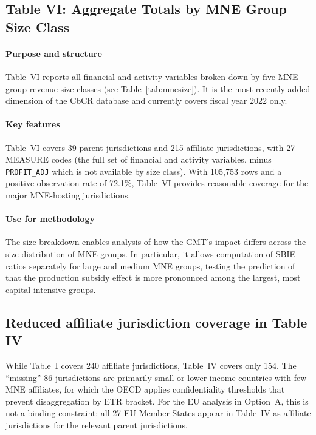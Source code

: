 \documentclass[11pt,a4paper]{article}
\newcommand{\code}[1]{\texttt{#1}}
\begin{document}
\subsection{Table VI: Aggregate Totals by MNE Group Size Class}\label{sec:table6}

\paragraph{Purpose and structure}
Table~VI reports all financial and activity variables broken down by five MNE group revenue size classes (see Table~\ref{tab:mnesize}). It is the most recently added dimension of the CbCR database and currently covers fiscal year 2022 only.

\paragraph{Key features}
Table~VI covers 39 parent jurisdictions and 215 affiliate jurisdictions, with 27 MEASURE codes (the full set of financial and activity variables, minus \code{PROFIT\_ADJ} which is not available by size class). With 105,753 rows and a positive observation rate of 72.1\%, Table~VI provides reasonable coverage for the major MNE-hosting jurisdictions.

\paragraph{Use for methodology}
The size breakdown enables analysis of how the GMT's impact differs across the size distribution of MNE groups. In particular, it allows computation of SBIE ratios separately for large and medium MNE groups, testing the prediction of \citet{schjelderup2024} that the production subsidy effect is more pronounced among the largest, most capital-intensive groups.

\subsection{Reduced affiliate jurisdiction coverage in Table IV}

While Table~I covers 240 affiliate jurisdictions, Table~IV covers only 154. The
``missing'' 86 jurisdictions are primarily small or lower-income countries with
few MNE affiliates, for which the OECD applies confidentiality thresholds that
prevent disaggregation by ETR bracket. For the EU analysis in Option~A, this is
not a binding constraint: all 27 EU Member States appear in Table~IV as affiliate
jurisdictions for the relevant parent jurisdictions.
\end{document}
